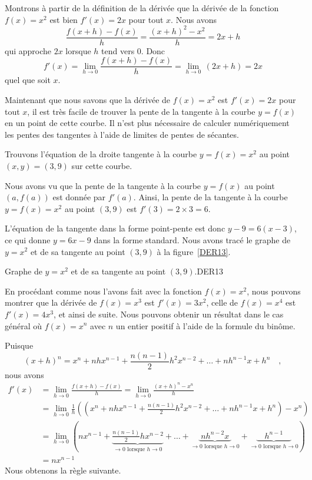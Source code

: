 {Montrons à partir de la définition de la dérivée que la dérivée de la
fonction $f(x)=x^2$ est bien $f'(x) = 2x$ pour tout $x$.  Nous avons
\[
\frac{f(x+h)-f(x)}{h} = \frac{(x+h)^2 - x^2}{h} = 2x + h
\]
qui approche $2x$ lorsque $h$ tend vers $0$.  Donc
\[
f'(x) = \lim_{h\rightarrow 0} \frac{f(x+h)-f(x)}{h}
= \lim_{h\rightarrow 0}\, (2x+h) = 2 x
\]
quel que soit $x$.

Maintenant que nous savons que la dérivée de $f(x)=x^2$ est $f'(x) = 2x$
pour tout $x$, il est très facile de trouver la pente de la tangente à
la courbe $y=f(x)$ en un point de cette courbe.  Il n'est plus
nécessaire de calculer numériquement les pentes des tangentes à l'aide
de limites de pentes de sécantes.

\begin{egg}
Trouvons l'équation de la droite tangente à la courbe $y= f(x) = x^2$
au point $(x,y)=(3,9)$ sur cette courbe.

Nous avons vu que la pente de la tangente à la courbe $y=f(x)$ au point
$(a,f(a))$ est donnée par $f'(a)$.  Ainsi, la pente de la tangente à la
courbe $y= f(x) = x^2$ au point $(3,9)$ est $f'(3) = 2\times 3 = 6$.

L'équation de la tangente dans la forme point-pente est donc
$y-9 = 6 (x-3)$, ce qui donne $y = 6x -9$ dans la forme standard.
Nous avons tracé le graphe de $y=x^2$ et de sa tangente au point
$(3,9)$ à la figure~\ref{DER13}.
\end{egg}

{Graphe de $y=x^2$ et de sa tangente au point $(3,9)$.}{DER13}

En procédant comme nous l'avons fait avec la fonction $f(x) = x^2$,
nous pouvons montrer que la dérivée de $f(x) = x^3$ est $f'(x) = 3x^2$,
celle de $f(x)=x^4$ est $f'(x) = 4 x^{3}$, et ainsi de suite.  Nous
pouvons obtenir un résultat dans le cas général où $f(x) = x^n$ avec
$n$ un entier positif à l'aide de la formule du binôme.

Puisque
\[
(x+h)^n = x^n + n h x^{n-1} + \frac{n(n-1)}{2} h^2 x^{n-2} + \ldots +
nh^{n-1}x + h^n \quad ,
\]
nous avons
\begin{align*}
f'(x) &= \lim_{h\to 0}\frac{f(x+h)-f(x)}{h}
= \lim_{h\to 0}\frac{(x+h)^n-x^n}{h} \\
&= \lim_{h\to 0}\frac{1}{h}
\left( \left(x^n + n h x^{n-1} + \frac{n(n-1)}{2} h^2 x^{n-2} + \ldots +
nh^{n-1}x + h^n\right)-x^n\right) \\
&= \lim_{h\to 0}
\left(n x^{n-1} + 
\underbrace{\frac{n(n-1)}{2} h x^{n-2}}_{\to 0 \text{ lorsque } h \to 0}
+ \ldots + \underbrace{\;nh^{n-2}x\;}_{\to 0 \text{ lorsque }h \to 0}
+ \underbrace{\quad h^{n-1}\quad }_{\to 0 \text{ lorsque } h\to 0}\right) \\
&= n x^{n-1}
\end{align*}
Nous obtenons la règle suivante.

}
